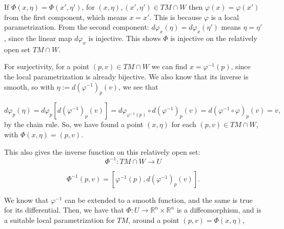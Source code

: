 \documentclass[a4paper,11pt,pdftex]{article}
\begin{document}
If $\Phi(x,\eta) = \Phi(x', \eta')$, for $(x, \eta), (x', \eta') \in TM\cap W$ then $\varphi(x) = \varphi(x')$ from the first component, which means $x=x'$. This is because $\varphi$ is a local parametrization. From the second component: $d\varphi_x(\eta) = d\varphi_x(\eta')$ means $\eta = \eta'$, since the linear map $d\varphi_x$ is injective. This shows $\Phi$ is injective on the relatively open set $TM\cap W$. 

For surjectivity, for a point $(p, v)\in TM\cap W$ we can find $x=\varphi^{-1}(p)$, since the local parametrization is already bijective. We also know that its inverse is smooth, so with $\eta := d(\varphi^{-1})_p(v)$, we see that

$$d\varphi_p(\eta)=d\varphi_p[d(\varphi^{-1})_p(v)] = d\varphi_{\varphi^{-1}(p)}\circ d(\varphi^{-1})_p(v) = d(\varphi^{-1}\circ \varphi)_p(v) = v,$$
by the chain rule. So, we have found a point $(x, \eta)$ for each $(p,v)\in  TM\cap W$, with $\Phi(x,\eta) = (p,v)$.

This also gives the inverse function on this relatively open set: 
$$
\Phi^{-1}: TM\cap W \to U
$$

$$
\Phi^{-1}(p, v) = \left[\varphi^{-1}(p), d(\varphi^{-1})_p(v)\right].
$$

We know that $\varphi^{-1}$ can be extended to a smooth function, and the same is true for its differential. Then, we have that $\Phi: U\to \mathbb{R}^n\times \mathbb{R}^n$ is a diffeomorphism, and is a suitable local parametrization for $TM$, around a point $(p,v)=\Phi(x, \eta)$,
\end{document}
